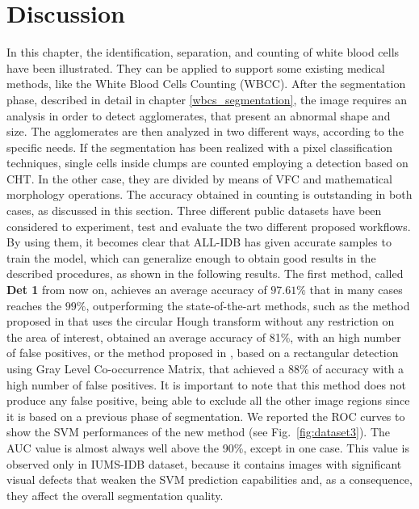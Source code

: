 {	\section{Discussion}
	In this chapter, the identification, separation, and counting of white blood cells have been illustrated. They can be applied to support some existing medical methods, like the White Blood Cells Counting (\acs{WBCC}). After the segmentation phase, described in detail in chapter \ref{wbcs_segmentation}, the image requires an analysis in order to detect agglomerates, that present an abnormal shape and size. The agglomerates are then analyzed in two different ways, according to the specific needs. If the segmentation has been realized with a pixel classification techniques, single cells inside clumps are counted employing a detection based on CHT. In the other case, they are divided by means of VFC and mathematical morphology operations. The accuracy obtained in counting is outstanding in both cases, as discussed in this section.
	Three different public datasets have been considered to experiment, test and evaluate the two different proposed workflows. By using them, it becomes clear that ALL-IDB has given accurate samples to train the model, which can generalize enough to obtain good results in the described procedures, as shown in the following results.
	The first method, called \textbf{Det 1} from now on, achieves an average accuracy of $97.61\%$ that in many cases reaches the $99\%$, outperforming the state-of-the-art methods, such as the method proposed in \cite{Mahmood} that uses the circular Hough transform without any restriction on the area of interest, obtained an average accuracy of 81\%, with an high number of false positives, or the method proposed in \cite{Alilou}, based on a rectangular detection using Gray Level Co-occurrence Matrix, that achieved a 88\% of accuracy with a high number of false positives. It is important to note that this method does not produce any false positive, being able to exclude all the other image regions since it is based on a previous phase of segmentation. 
	We reported the ROC curves to show the SVM performances of the new method (see Fig.~\ref{fig:dataset3}). The AUC value is almost always well above the 90\%, except in one case. This value is observed only in IUMS-IDB dataset, because it contains images with significant visual defects that weaken the SVM prediction capabilities and, as a consequence, they affect the overall segmentation quality.
	
}
